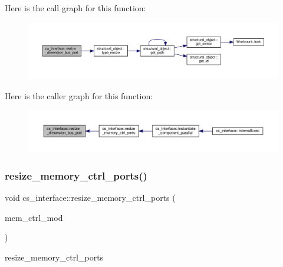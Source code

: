 Here is the call graph for this function\+:
\nopagebreak
\begin{figure}[H]
\begin{center}
\leavevmode
\includegraphics[width=350pt]{d1/dfa/classcs__interface_a6c229dab4a01f3cde49f836faefde734_cgraph}
\end{center}
\end{figure}
Here is the caller graph for this function\+:
\nopagebreak
\begin{figure}[H]
\begin{center}
\leavevmode
\includegraphics[width=350pt]{d1/dfa/classcs__interface_a6c229dab4a01f3cde49f836faefde734_icgraph}
\end{center}
\end{figure}
\mbox{\label{classcs__interface_a616abde63bd8faaf2dd2d3ebed402ee8}} 
\subsubsection{\texorpdfstring{resize\+\_\+memory\+\_\+ctrl\+\_\+ports()}{resize\_memory\_ctrl\_ports()}}
{\footnotesize\ttfamily void cs\+\_\+interface\+::resize\+\_\+memory\+\_\+ctrl\+\_\+ports (\begin{DoxyParamCaption}\item[{\hyperlink{structural__objects_8hpp_a8ea5f8cc50ab8f4c31e2751074ff60b2}{structural\+\_\+object\+Ref}}]{mem\+\_\+ctrl\+\_\+mod }\end{DoxyParamCaption})\hspace{0.3cm}{\ttfamily [protected]}}



resize\+\_\+memory\+\_\+ctrl\+\_\+ports 



